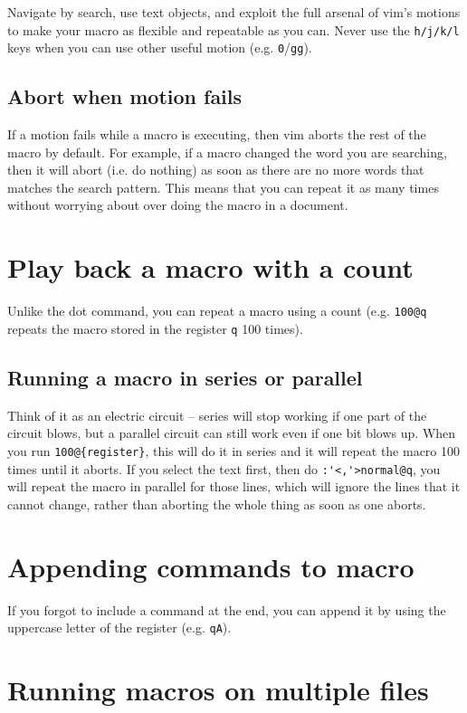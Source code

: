 Navigate by search, use text objects, and exploit the full arsenal of vim's motions to make your macro as flexible and repeatable as you can.
Never use the \verb|h/j/k/l| keys when you can use other useful motion (e.g. \verb|0|/\verb|gg|).

\subsection{Abort when motion fails}

If a motion fails while a macro is executing, then vim aborts the rest of the macro by default.
For example, if a macro changed the word you are searching, then it will abort (i.e. do nothing) as soon as there are no more words that matches the search pattern.
This means that you can repeat it as many times without worrying about over doing the macro in a document.

\section{Play back a macro with a count}

Unlike the dot command, you can repeat a macro using a count (e.g. \verb|100@q| repeats the macro stored in the register \verb|q| 100 times).

\subsection{Running a macro in series or parallel}

Think of it as an electric circuit -- series will stop working if one part of the circuit blows, but a parallel circuit can still work even if one bit blows up.
When you run \verb|100@{register}|, this will do it in series and it will repeat the macro 100 times until it aborts.
If you select the text first, then do \verb|:'<,'>normal@q|, you will repeat the macro in parallel for those lines, which will ignore the lines that it cannot change, rather than aborting the whole thing as soon as one aborts.

\section{Appending commands to macro}

If you forgot to include a command at the end, you can append it by using the uppercase letter of the register (e.g. \verb|qA|).

\section{Running macros on multiple files}

